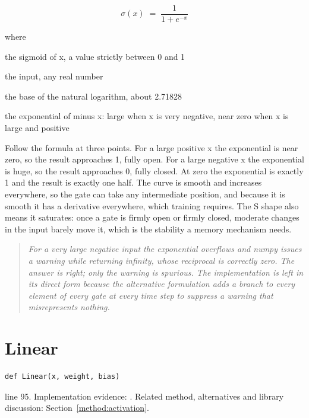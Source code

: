 \begin{equation}
\sigma(x) \;=\; \frac{1}{1 + e^{-x}}
\end{equation}

\noindent where
\begin{description}[leftmargin=2.4em,style=nextline,font=\normalfont\ttfamily]\setlength\itemsep{1pt}
  \item[{$\sigma(x)$}] \normalfont the sigmoid of x, a value strictly between 0 and 1
  \item[{$x$}] \normalfont the input, any real number
  \item[{$e$}] \normalfont the base of the natural logarithm, about 2.71828
  \item[{$e^{-x}$}] \normalfont the exponential of minus x: large when x is very negative, near zero when x is large and positive
\end{description}

Follow the formula at three points. For a large positive x the exponential is near zero, so the result approaches 1, fully open. For a large negative x the exponential is huge, so the result approaches 0, fully closed. At zero the exponential is exactly 1 and the result is exactly one half. The curve is smooth and increases everywhere, so the gate can take any intermediate position, and because it is smooth it has a derivative everywhere, which training requires. The S shape also means it saturates: once a gate is firmly open or firmly closed, moderate changes in the input barely move it, which is the stability a memory mechanism needs.


\begin{quote}\small\itshape For a very large negative input the exponential overflows and numpy issues a warning while returning infinity, whose reciprocal is correctly zero. The answer is right; only the warning is spurious. The implementation is left in its direct form because the alternative formulation adds a branch to every element of every gate at every time step to suppress a warning that misrepresents nothing.\end{quote}


\section{Linear}\label{fn:recognise:Linear}
\begin{lstlisting}[style=sig]
def Linear(x, weight, bias)
\end{lstlisting}
 line 95. Implementation evidence: \cite{code2026}. Related method, alternatives and library discussion: Section~\ref{method:activation}.


